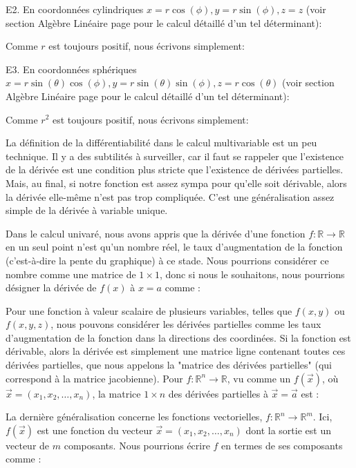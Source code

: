 	\pagebreak
	\begin{tcolorbox}[colframe=black,colback=white,sharp corners]
	E2. En coordonnées cylindriques $x=r\cos(\phi),y=r\sin(\phi),z=z$ (voir section Algèbre Linéaire page \pageref{determinant} pour le calcul détaillé d'un tel déterminant):
	
	Comme $r$ est toujours positif, nous écrivons simplement:
	
	
	E3. \label{jacobian spherical coordinates}En coordonnées sphériques  $x=r\sin(\theta)\cos(\phi),y=r\sin(\theta)\sin(\phi),z=r\cos(\theta)$ (voir section Algèbre Linéaire page \pageref{determinant}  pour le calcul détaillé d'un tel déterminant):
	
	Comme $r^2$ est toujours positif, nous écrivons simplement:
	
	\end{tcolorbox}
	La définition de la différentiabilité dans le calcul multivariable est un peu technique. Il y a des subtilités à surveiller, car il faut se rappeler que l'existence de la dérivée est une condition plus stricte que l'existence de dérivées partielles. Mais, au final, si notre fonction est assez sympa pour qu'elle soit dérivable, alors la dérivée elle-même n'est pas trop compliquée. C'est une généralisation assez simple de la dérivée à variable unique.
	
	Dans le calcul univaré, nous avons appris que la dérivée d'une fonction $f : \mathbb{R} \rightarrow \mathbb{R}$ en un seul point n'est qu'un nombre réel, le taux d'augmentation de la fonction (c'est-à-dire la pente du graphique) à ce stade. Nous pourrions considérer ce nombre comme une matrice de $1 \times 1$, donc si nous le souhaitons, nous pourrions désigner la dérivée de $f(x)$ à $x=a$ comme :
	
	Pour une fonction à valeur scalaire de plusieurs variables, telles que $f(x, y)$ ou $f(x, y, z)$, nous pouvons considérer les dérivées partielles comme les taux d'augmentation de la fonction dans la directions des coordinées. Si la fonction est dérivable, alors la dérivée est simplement une matrice ligne contenant toutes ces dérivées partielles, que nous appelons la "matrice des dérivées partielles" (qui correspond à la matrice jacobienne). Pour $f : \mathbb{R}^{n} \rightarrow \mathbb{R}$, vu comme un $f(\vec{x})$, où $\vec{x}=\left(x_{1 }, x_{2}, \ldots, x_{n}\right)$, la matrice $1 \times n$ des dérivées partielles à $\vec{x}=\vec{a}$ est :
	
	La dernière généralisation concerne les fonctions vectorielles, $f : \mathbb{R}^{n} \rightarrow \mathbb{R}^{m}$. Ici, $f(\vec{x})$ est une fonction du vecteur $\vec{x}=\left(x_{1}, x_{2}, \ldots, x_{n}\right)$ dont la sortie est un vecteur de $m$ composants. Nous pourrions écrire $f$ en termes de ses composants comme :
	

